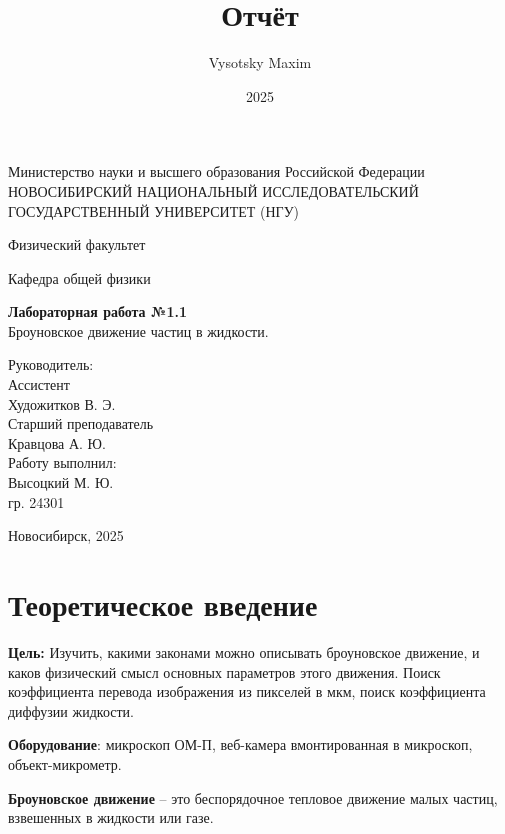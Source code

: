 \documentclass[a4paper,14pt]{article}
\author{Vysotsky Maxim}
\title{Отчёт}
\date{2025}
\begin{document}
	\begin{titlepage}
		\begin{center}
			{Министерство науки и высшего образования Российской Федерации
				НОВОСИБИРСКИЙ НАЦИОНАЛЬНЫЙ ИССЛЕДОВАТЕЛЬСКИЙ
				ГОСУДАРСТВЕННЫЙ УНИВЕРСИТЕТ (НГУ)}
		\end{center}
		\begin{center}
			{Физический факультет}
		\end{center}
		\begin{center}
			{Кафедра общей физики}
		\end{center}
		
		
		\vspace{7cm}
		{
			\begin{center}
				{\bf Лабораторная работа №1.1}\\
			Броуновское движение частиц в жидкости.
			\end{center}
		}
		\vspace{2cm}
		\begin{flushright}
			{Руководитель:\\ Ассистент\\
				Художитков В. Э.\\
                Старший преподаватель \\
                Кравцова А. Ю.\\
				Работу выполнил:\\
				Высоцкий М. Ю.\\
				\vspace{0.2cm}
				гр. 24301}
		\end{flushright}
		\vspace{3cm}
		\begin{center}
			Новосибирск, 2025
		\end{center}
	\end{titlepage}

\section{Теоретическое введение}
\hspace{\parindent}\textbf{Цель:} Изучить, какими законами можно описывать броуновское
движение, и каков физический смысл основных параметров этого движения. Поиск коэффициента перевода изображения из пикселей в мкм, поиск коэффициента диффузии жидкости.

\textbf{Оборудование}: микроскоп ОМ-П, веб-камера вмонтированная в микроскоп, объект-микрометр. 

\textbf{Броуновское движение} – это беспорядочное тепловое движение малых частиц,
взвешенных в жидкости или газе. 
\end{document}

